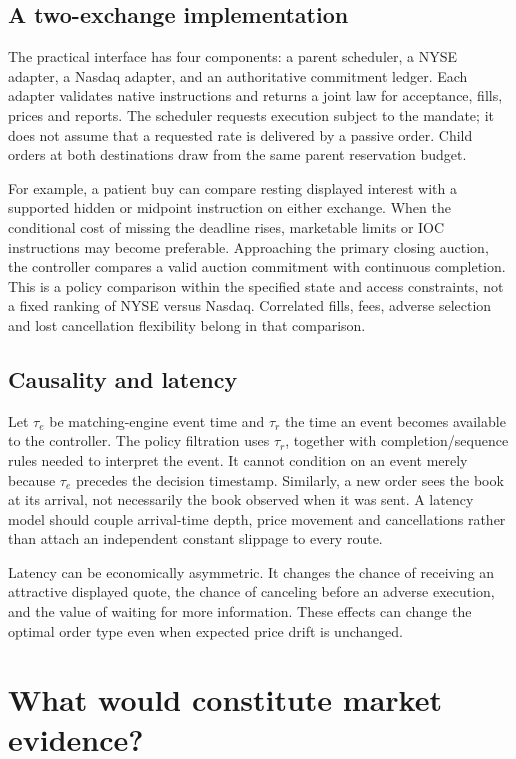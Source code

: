 \documentclass[11pt]{article}
\numberwithin{equation}{section}
\theoremstyle{definition}
\theoremstyle{remark}
\theoremstyle{definition}
\begin{document}
\subsection{A two-exchange implementation}

The practical interface has four components: a parent scheduler, a NYSE adapter,
a Nasdaq adapter, and an authoritative commitment ledger. Each adapter validates
native instructions and returns a joint law for acceptance, fills, prices and
reports. The scheduler requests execution subject to the mandate; it does not
assume that a requested rate is delivered by a passive order. Child orders at
both destinations draw from the same parent reservation budget.

For example, a patient buy can compare resting displayed interest with a
supported hidden or midpoint instruction on either exchange. When the
conditional cost of missing the deadline rises, marketable limits or IOC
instructions may become preferable. Approaching the primary closing auction,
the controller compares a valid auction commitment with continuous completion.
This is a policy comparison within the specified state and access constraints,
not a fixed ranking of NYSE versus Nasdaq. Correlated fills, fees, adverse
selection and lost cancellation flexibility belong in that comparison.

\subsection{Causality and latency}

Let $\tau_e$ be matching-engine event time and $\tau_r$ the time an event becomes
available to the controller. The policy filtration uses $\tau_r$, together
with completion/sequence rules needed to interpret the event. It cannot
condition on an event merely because $\tau_e$ precedes the decision timestamp.
Similarly, a new order sees the book at its arrival, not necessarily the book
observed when it was sent. A latency model should couple arrival-time depth,
price movement and cancellations rather than attach an independent constant
slippage to every route.

Latency can be economically asymmetric. It changes the chance of receiving
an attractive displayed quote, the chance of canceling before an adverse
execution, and the value of waiting for more information. These effects can
change the optimal order type even when expected price drift is unchanged.

\section{What would constitute market evidence?}\label{sec:validation}
\end{document}
